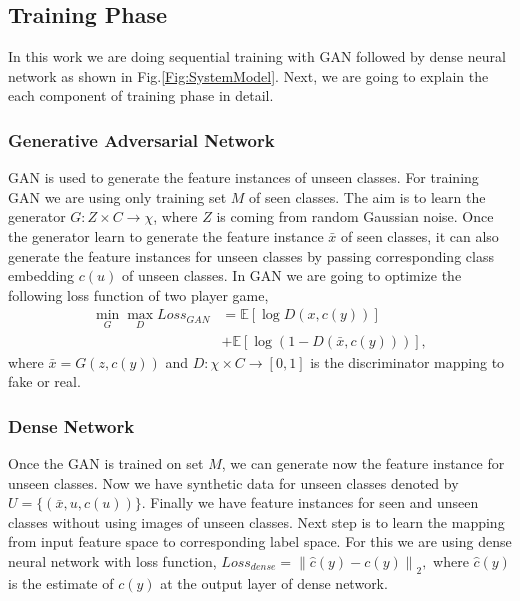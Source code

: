 \documentclass[11pt, conference, english]{IEEEtran}
\theoremstyle{plain}
\theoremstyle{definition}
\theoremstyle{remark}
\newcommand{\eq}[1]{\begin{align*}#1\end{align*}}
\newcommand{\norm}[1]{\left\lVert#1\right\rVert}
\newcommand{\E}{\mathbb{E}}
\begin{document}
	
	\subsection{Training Phase}
	In this work we are doing sequential training with GAN followed by dense neural network as shown in Fig.\ref{Fig:SystemModel}. Next, we are going to explain the each component of training phase in detail.
	\subsubsection{Generative Adversarial Network } GAN is used to generate the feature instances of unseen classes. For training GAN we are using only training set $M$ of seen classes. The aim is to learn the generator $G:Z \times C \rightarrow \chi$, where $Z$ is coming from random Gaussian noise. Once the generator learn to generate the feature instance $\bar{x}$ of seen classes, it can also generate the feature instances for unseen classes by passing corresponding class embedding $c(u)$ of unseen classes. In GAN we are going to optimize the following loss function of two player game,
	\eq{\min_G \max_D Loss_{GAN}&=\E [\log D(x,c(y))]\\
		&+\E[\log(1-D(\bar{x},c(y)))],}
	where $\bar{x}=G(z,c(y))$ and $D:\chi \times C \rightarrow [0,1]$ is the discriminator mapping to fake or real.
	\subsubsection{Dense Network}
	 Once the GAN is trained on set $M$, we can generate now the feature instance for unseen classes. Now we have synthetic data for unseen classes denoted by 
	$U=\{(\bar{x},u,c(u))\}$. Finally we have feature instances for seen and unseen classes without using images of unseen classes. Next step is to learn the mapping from input feature space to corresponding label space. For this we are using dense neural network with loss function,
	$Loss_{dense}=\norm{\hat{c}(y)-c(y)}_2,$
	where $\hat{c}(y)$ is the estimate of $c(y)$ at the output layer of dense network. 
	
\end{document}
